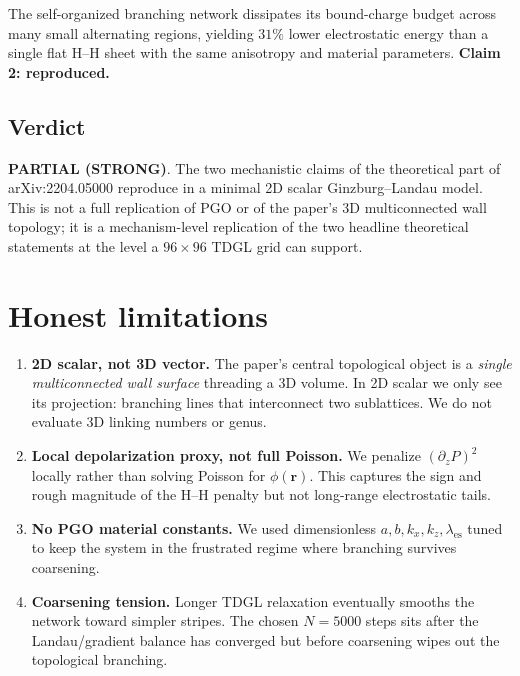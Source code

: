 \documentclass[10pt]{article}
\begin{document}
The self-organized branching network dissipates its bound-charge budget across
many small alternating regions, yielding $31\%$ lower electrostatic energy than
a single flat H--H sheet with the same anisotropy and material parameters.
\textbf{Claim 2: reproduced.}

\subsection{Verdict}

\textbf{PARTIAL (STRONG)}. The two mechanistic claims of the theoretical part of
arXiv:2204.05000 reproduce in a minimal 2D scalar Ginzburg--Landau model.
This is not a full replication of PGO or of the paper's 3D multiconnected wall
topology; it is a mechanism-level replication of the two headline theoretical
statements at the level a $96\times96$ TDGL grid can support.

\section{Honest limitations}

\begin{enumerate}
  \item \textbf{2D scalar, not 3D vector.} The paper's central topological
        object is a \emph{single multiconnected wall surface} threading a 3D
        volume. In 2D scalar we only see its projection: branching lines that
        interconnect two sublattices. We do not evaluate 3D linking numbers or
        genus.
  \item \textbf{Local depolarization proxy, not full Poisson.} We penalize
        $(\partial_z P)^2$ locally rather than solving Poisson for $\phi(\mathbf r)$.
        This captures the sign and rough magnitude of the H--H penalty but not
        long-range electrostatic tails.
  \item \textbf{No PGO material constants.} We used dimensionless
        $a,b,k_x,k_z,\lambda_{\text{es}}$ tuned to keep the system in the
        frustrated regime where branching survives coarsening.
  \item \textbf{Coarsening tension.} Longer TDGL relaxation eventually smooths
        the network toward simpler stripes. The chosen $N=5000$ steps sits
        after the Landau/gradient balance has converged but before coarsening
        wipes out the topological branching.
\end{enumerate}
\end{document}
